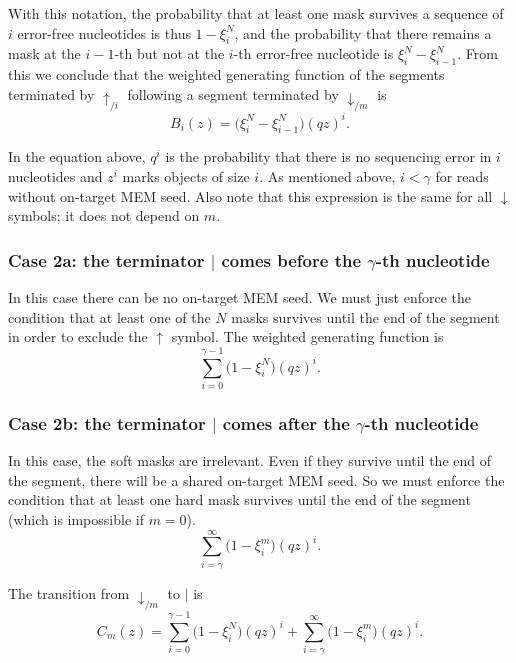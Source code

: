\documentclass{article}
\begin{document}
With this notation, the probability that at least one mask survives a
sequence of $i$ error-free nucleotides is thus $1-\xi_i^N$, and the
probability that there remains a mask at the $i-1$-th but not at the 
$i$-th error-free nucleotide is $\xi_i^N - \xi_{i-1}^N$. From this we
conclude that the weighted generating function of the segments terminated
by $\uparrow_{/i}$ following a segment terminated by $\downarrow_{/m}$ is
\begin{equation}
\label{eq:B}
B_i(z) = \Big( \xi_i^N-\xi_{i-1}^N \Big) (qz)^i.
\end{equation}

In the equation above, $q^i$ is the probability that there is no
sequencing error in $i$ nucleotides and $z^i$ marks objects of size $i$.
As mentioned above, $i < \gamma$ for reads without on-target MEM seed.
Also note that this expression is the same for all $\downarrow$ symbols;
it does not depend on $m$.

\subsubsection*{Case 2a: the terminator $|$ comes before the $\gamma$-th
nucleotide}

In this case there can be no on-target MEM seed. We must just enforce the
condition that at least one of the $N$ masks survives until the end of the
segment in order to exclude the $\uparrow$ symbol. The weighted generating
function is
\begin{equation*}
\sum_{i=0}^{\gamma-1} \Big(1 - \xi_i^N \Big) (qz)^i.
\end{equation*}

\subsubsection*{Case 2b: the terminator $|$ comes after the $\gamma$-th
nucleotide}

In this case, the soft masks are irrelevant. Even if they survive until
the end of the segment, there will be a shared on-target MEM seed. So we
must enforce the condition that at least one hard mask survives until the
end of the segment (which is impossible if $m = 0$).
\begin{equation*}
\sum_{i=\gamma}^\infty \Big(1 - \xi_i^m \Big) (qz)^i.
\end{equation*}

The transition from $\downarrow_{/m}$ to $|$ is
\begin{equation}
\label{eq:C}
C_m(z) =
\sum_{i=0}^{\gamma-1} \Big(1 - \xi_i^N \Big) (qz)^i +
  \sum_{i=\gamma}^\infty \Big(1 - \xi_i^m \Big) (qz)^i.
\end{equation}
\end{document}
